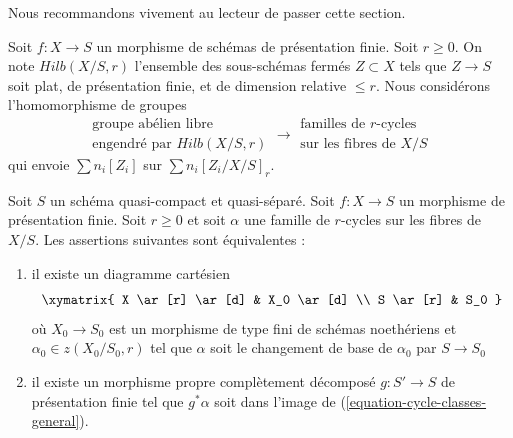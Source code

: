 \noindent
 Nous recommandons vivement au lecteur de passer cette section. 

\medskip\noindent
 Soit  $f : X \to S$  un morphisme de schémas de présentation finie. 
Soit $r \geq 0$. On note  $Hilb(X/S, r)$  l'ensemble des sous-schémas fermés  
$Z \subset X$ tels que  $Z \to S$  soit plat, de présentation finie,
 et de dimension relative $\leq r$. Nous considérons l'homomorphisme de groupes 
\begin{equation} 
\label{equation-cycle-classes-general} 
\begin{matrix} 
\text{groupe abélien libre} \\ 
\text{engendré par }Hilb(X/S, r) 
\end{matrix} 
\longrightarrow
\begin{matrix} 
\text{familles de }r\text{-cycles}\\ 
\text{sur les fibres de }X/S 
\end{matrix} 
\end{equation} 
qui envoie  $\sum n_i[Z_i]$  sur  $\sum n_i[Z_i/X/S]_r$. 

\begin{lemma} 
\label{lemma-relative-r-cycle-general} 
Soit  $S$  un schéma quasi-compact et quasi-séparé. 
Soit  $f : X \to S$  un morphisme de présentation finie. 
Soit  $r \geq 0$  et soit  $\alpha$  une famille de $r$-cycles sur les fibres de $X/S$. 
Les assertions suivantes sont équivalentes : 
\begin{enumerate} 
\item il existe un diagramme cartésien 
$$
\xymatrix{
X \ar[r] \ar[d] & X_0 \ar[d] \\
S \ar[r] & S_0
}
$$
 où  $X_0 \to S_0$  est un morphisme de type fini de schémas noethériens
 et $\alpha_0 \in z(X_0/S_0, r)$  tel que  $\alpha$  soit le changement de base 
de  $\alpha_0$  par $S \to S_0$
\item il existe un morphisme propre complètement décomposé  $g : S' \to S$
  de présentation finie tel que  $g^*\alpha$  soit dans l'image de 
(\ref{equation-cycle-classes-general}). 
\end{enumerate} 
\end{lemma} 

